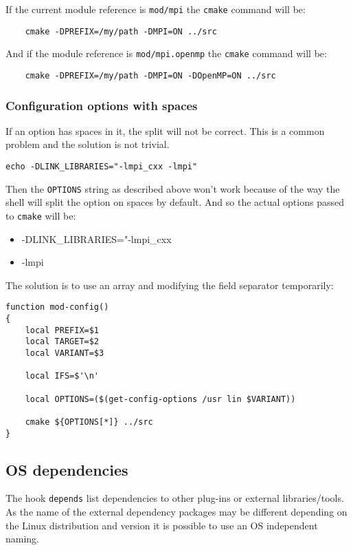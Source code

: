\documentclass[a4paper,12pt,twoside]{article}
\newcommand{\code}[1]{\texttt{#1}}
\begin{document}
If the current module reference is \code{mod/mpi} the \code{cmake} command will be:

\begin{lstlisting}
	cmake -DPREFIX=/my/path -DMPI=ON ../src
\end{lstlisting}

And if the module reference is \code{mod/mpi.openmp} the \code{cmake} command will be:

\begin{lstlisting}
	cmake -DPREFIX=/my/path -DMPI=ON -DOpenMP=ON ../src
\end{lstlisting}

\subsubsection{Configuration options with spaces}
\label{config options spaces}

If an option has spaces in it, the split will not be correct. This is a common problem and the solution is not trivial.

\code{echo -DLINK\_LIBRARIES="-lmpi\_cxx -lmpi"}

Then the \code{OPTIONS} string as described above won't work because of the way the shell will split the option on spaces by default. And so the actual options passed to \code{cmake} will be:

\begin{itemize}
	\item -DLINK\_LIBRARIES="-lmpi\_cxx
	\item -lmpi
\end{itemize}

The solution is to use an array and modifying the field separator temporarily:

\begin{lstlisting}
function mod-config()
{
	local PREFIX=$1
	local TARGET=$2
	local VARIANT=$3

	local IFS=$'\n'

	local OPTIONS=($(get-config-options /usr lin $VARIANT))

	cmake ${OPTIONS[*]} ../src
}
\end{lstlisting}

\subsection{OS dependencies}
\label{OS dependencies}

The hook \code{depends} list dependencies to other plug-ins or external libraries/tools. As the name of the external dependency packages may be different depending on the Linux distribution and version it is possible to use an OS independent naming.
\end{document}
